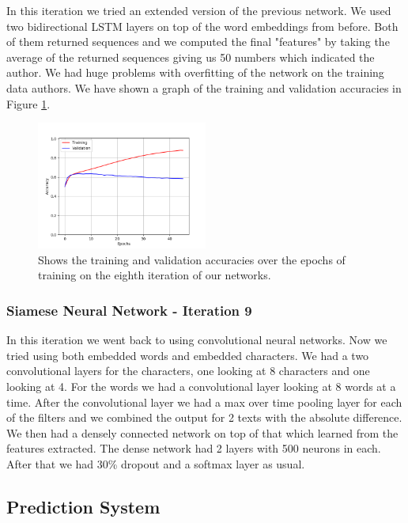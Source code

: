 In this iteration we tried an extended version of the previous network. We used
two bidirectional \gls{LSTM} layers on top of the word embeddings from before.
Both of them returned sequences and we computed the final "features" by taking
the average of the returned sequences giving us 50 numbers which indicated the
author. We had huge problems with overfitting of the network on the training
data authors. We have shown a graph of the training and validation accuracies
in Figure \ref{fig:network_8_accuracies}.

\begin{figure}
    \centering
    \includegraphics[width=0.5\textwidth]{./pictures/experiments/network_8_accuracies.png}
    \caption{Shows the training and validation accuracies over the epochs of
        training on the eighth iteration of our networks.}
    \label{fig:network_8_accuracies}
\end{figure}


\subsubsection{Siamese Neural Network - Iteration 9}

In this iteration we went back to using convolutional neural networks. Now we
tried using both embedded words and embedded characters. We had a two
convolutional layers for the characters, one looking at 8 characters and one
looking at 4. For the words we had a convolutional layer looking at 8 words at a
time. After the convolutional layer we had a max over time pooling layer for
each of the filters and we combined the output for 2 texts with the absolute
difference. We then had a densely connected network on top of that which learned
from the features extracted. The dense network had 2 layers with 500 neurons in
each. After that we had 30\% dropout and a softmax layer as usual.


\subsection{Prediction System}


